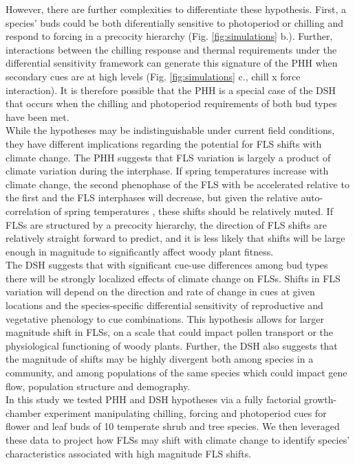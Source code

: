 \documentclass[11pt]{article}\usepackage[]{graphicx}\usepackage[]{color}
\begin{document}
\noindent However, there are further complexities to differentiate these hypothesis. First, a species' buds could be both diferentially sensitive to photoperiod or chilling and respond to forcing in a precocity hierarchy (Fig. \ref{fig:simulations} b.). Further, interactions between the chilling response and thermal requirements under the differential sensitivity framework can generate this signature of the PHH when secondary cues are at high levels (Fig. \ref{fig:simulations} c., chill x force interaction). It is therefore possible that the PHH is a special case of the DSH that occurs when the chilling and photoperiod requirements of both bud types have been met.\\

\noident While the hypotheses may be indistinguishable under current field conditions, they have different implications regarding the potential for FLS shifts with climate change. The PHH suggests that FLS variation is largely a product of climate variation during the interphase. If spring temperatures increase with climate change, the second phenophase of the FLS with be accelerated relative to the first and the FLS interphases will decrease, but given the relative auto-correlation of spring temperatures \citep{Di-Cecco:2018aa}, these shifts should be relatively muted. If FLSs are structured by a precocity hierarchy, the direction of FLS shifts are relatively straight forward to predict, and it is less likely that shifts will be large enough in magnitude to significantly affect woody plant fitness.\\

\noindent The DSH suggests that with significant cue-use differences among bud types there will be strongly localized effects of climate change on FLSs. Shifts in FLS variation will depend on the direction and rate of change in cues at given locations and the species-specific differential sensitivity of reproductive and vegetative phenology to cue combinations. This hypothesis allows for larger magnitude shift in FLSs, on a scale that could impact pollen transport or the physiological functioning of woody plants. Further, the DSH also suggests that the magnitude of shifts may be highly divergent both among species in a community, and among populations of the same species which could impact gene flow, population structure and demography.\\

\noindent In this study we tested PHH and DSH hypotheses via a fully factorial growth-chamber experiment manipulating chilling, forcing and photoperiod cues for flower and leaf buds of 10 temperate shrub and tree species. We then leveraged these data to project how FLSs may shift with climate change to identify species' characteristics associated with high magnitude FLS shifts.\\
\end{document}
